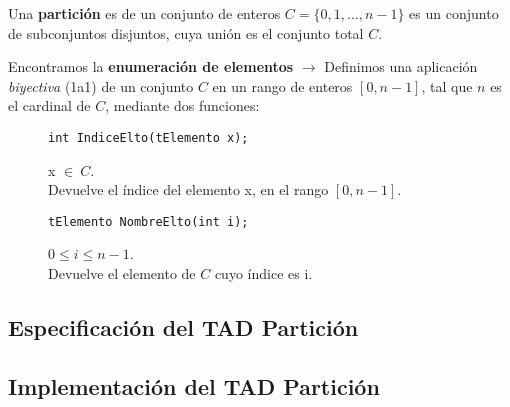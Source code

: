 Una \textbf{partición} es de un conjunto de enteros \(C = \{0,1,...,n-1\}\) es un conjunto de subconjuntos disjuntos, cuya unión es el conjunto total \(C\).

Encontramos la \textbf{enumeración de elementos} \(\rightarrow\) Definimos una aplicación \textit{biyectiva} (1a1) de un conjunto \(C\) en un rango de enteros \([0,n-1]\), tal que \(n\) es el cardinal de \(C\), mediante dos funciones:

\begin{figure}[h]
  \begin{minipage}{.4\textwidth}
    \begin{center}
      \verb|int IndiceElto(tElemento x);|
    \end{center}
     x \(\in\ C\).\\
     Devuelve el índice del elemento x, en el rango \([0,n-1]\).
  \end{minipage}
  \hfill
  \begin{minipage}{.4\textwidth}
    \begin{center}
      \verb|tElemento NombreElto(int i);|
    \end{center}
     \(0 \leq i \leq n-1\).\\
     Devuelve el elemento de \(C\) cuyo índice es i.
  \end{minipage}
\end{figure}
\newpage
\subsection{Especificación del TAD Partición}

\subsection{Implementación del TAD Partición}

